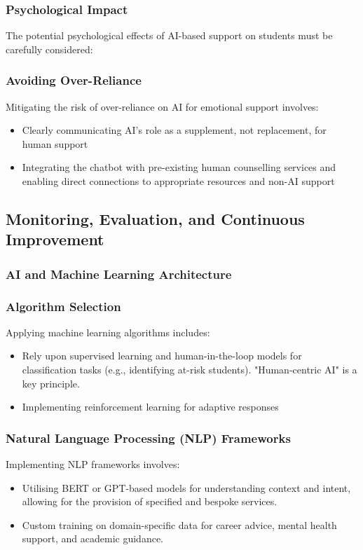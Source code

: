 \documentclass[14pt,a4paper]{article}
\begin{document}
\begin{multicols}{2}
\subsubsection{Psychological Impact}
The potential psychological effects of AI-based support on students must be carefully considered:

\subsubsection*{Avoiding Over-Reliance}
Mitigating the risk of over-reliance on AI for emotional support \textit{\parencite[p. 746]{Miner2022}} involves:
\begin{itemize}
    \item Clearly communicating AI's role as a supplement, not replacement, for human support
    \item Integrating the chatbot with pre-existing human counselling services and enabling direct connections to appropriate resources and non-AI support
\end{itemize}

\newpage
\subsection{Monitoring, Evaluation, and Continuous Improvement}
\subsubsection{AI and Machine Learning Architecture}

\subsubsection*{Algorithm Selection}
Applying machine learning algorithms \textit{\parencite[pp. 25-50]{Geron2024}} includes:
\begin{itemize}
    \item Rely upon supervised learning and human-in-the-loop models for classification tasks (e.g., identifying at-risk students). "Human-centric AI" is a key principle.
    \item Implementing reinforcement learning for adaptive responses
\end{itemize}
\subsubsection*{Natural Language Processing (NLP) Frameworks}
Implementing NLP frameworks \textit{\parencite[pp. 1-15]{JurafskyMartin2024}} involves:
\begin{itemize}
    \item Utilising BERT or GPT-based models for understanding context and intent, allowing for the provision of specified and bespoke services.
    \item Custom training on domain-specific data for career advice, mental health support, and academic guidance.
\end{itemize}


\end{multicols}
\end{document}
